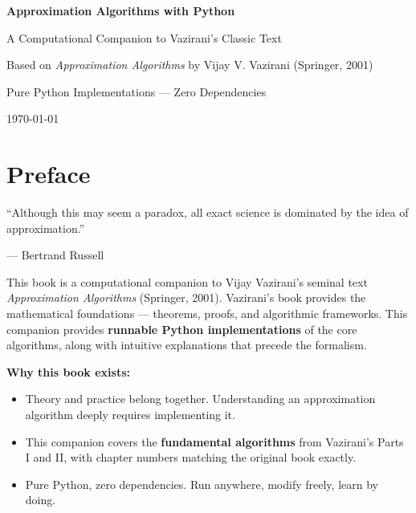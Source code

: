 \documentclass[11pt,oneside]{book}
\begin{document}
\frontmatter

\begin{titlepage}
    \centering
    \vspace*{3cm}
    {\Huge\bfseries\color{darkblue} Approximation Algorithms with Python\par}
    \vspace{1.5cm}
    {\Large A Computational Companion to Vazirani's Classic Text\par}
    \vspace{2cm}
    {\large Based on \textit{Approximation Algorithms} by Vijay V. Vazirani (Springer, 2001)\par}
    \vspace{3cm}
    {\large Pure Python Implementations — Zero Dependencies\par}
    \vfill
    {\small \today\par}
\end{titlepage}

\chapter*{Preface}

\epigraph{``Although this may seem a paradox, all exact science is dominated by the idea of approximation.''}{— Bertrand Russell}

\vspace{1em}

This book is a computational companion to Vijay Vazirani's seminal text \textit{Approximation Algorithms} (Springer, 2001). Vazirani's book provides the mathematical foundations — theorems, proofs, and algorithmic frameworks. This companion provides \textbf{runnable Python implementations} of the core algorithms, along with intuitive explanations that precede the formalism.

\vspace{1em}

\noindent \textbf{Why this book exists:}
\begin{itemize}
    \item Theory and practice belong together. Understanding an approximation algorithm deeply requires implementing it.
    \item This companion covers the \textbf{fundamental algorithms} from Vazirani's Parts I and II, with chapter numbers matching the original book exactly.
    \item Pure Python, zero dependencies. Run anywhere, modify freely, learn by doing.
\end{itemize}
\end{document}
